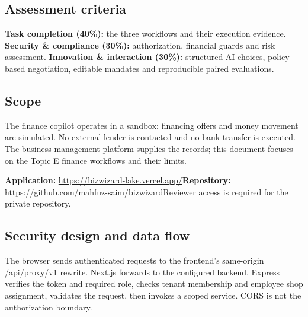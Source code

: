 \documentclass[10pt,a4paper]{article}
\begin{document}
\subsection*{Assessment criteria}

\textbf{Task completion (40\%):} the three workflows and their execution evidence. \textbf{Security \& compliance (30\%):} authorization, financial guards and risk assessment. \textbf{Innovation \& interaction (30\%):} structured AI choices, policy-based negotiation, editable mandates and reproducible paired evaluations.


\subsection*{Scope}

The finance copilot operates in a sandbox: financing offers and money movement are simulated. No external lender is contacted and no bank transfer is executed. The business-management platform supplies the records; this document focuses on the Topic E finance workflows and their limits.


\textbf{Application:} \url{https://bizwizard-lake.vercel.app/}\newline \textbf{Repository:} \url{https://github.com/mahfuz-saim/bizwizard}\newline Reviewer access is required for the private repository.


\clearpage


\ArchitectureDiagram

\subsection*{Security design and data flow}

The browser sends authenticated requests to the frontend's same-origin /api/proxy/v1 rewrite. Next.js forwards to the configured backend. Express verifies the token and required role, checks tenant membership and employee shop assignment, validates the request, then invokes a scoped service. CORS is not the authorization boundary.
\end{document}

